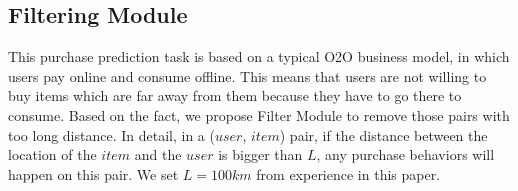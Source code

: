 \documentclass{llncs}
\begin{document}
\subsection{Filtering Module}
This purchase prediction task is based on a typical O2O business model,
in which users pay online and consume offline.
This means that users are not willing to buy items
which are far away from them because they have to go there to consume.
Based on the fact, we propose Filter Module to remove those pairs with too long distance.
In detail, in a ($user$, $item$) pair,
if the distance between the location of the $item$ and the $user$ is bigger than $L$,
any purchase behaviors will happen on this pair.
We set $L = 100km$ from experience in this paper.





\end{document}
